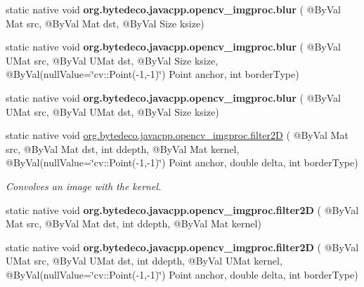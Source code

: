 \begin{DoxyCompactItemize}
\mbox{\label{group__imgproc__filter_ga4830c7c2c9e1f24506bac7bf41da80f0}} 
static native void {\bfseries org.\+bytedeco.\+javacpp.\+opencv\+\_\+imgproc.\+blur} ( @By\+Val Mat src, @By\+Val Mat dst, @By\+Val Size ksize)
\item 
\mbox{\label{group__imgproc__filter_gaf8d9d0c058877480d92f97c45f328347}} 
static native void {\bfseries org.\+bytedeco.\+javacpp.\+opencv\+\_\+imgproc.\+blur} ( @By\+Val U\+Mat src, @By\+Val U\+Mat dst, @By\+Val Size ksize, @By\+Val(null\+Value=\char`\"{}cv\+::\+Point(-\/1,-\/1)\char`\"{}) Point anchor, int border\+Type)
\item 
\mbox{\label{group__imgproc__filter_ga8c4367bdc80978100e7b53b8db658752}} 
static native void {\bfseries org.\+bytedeco.\+javacpp.\+opencv\+\_\+imgproc.\+blur} ( @By\+Val U\+Mat src, @By\+Val U\+Mat dst, @By\+Val Size ksize)
\item 
static native void \hyperlink{group__imgproc__filter_gac272007b4c23c22cf0fd246522a2a34b}{org.\+bytedeco.\+javacpp.\+opencv\+\_\+imgproc.\+filter2D} ( @By\+Val Mat src, @By\+Val Mat dst, int ddepth, @By\+Val Mat kernel, @By\+Val(null\+Value=\char`\"{}cv\+::\+Point(-\/1,-\/1)\char`\"{}) Point anchor, double delta, int border\+Type)
\begin{DoxyCompactList}\small\item\em Convolves an image with the kernel. \end{DoxyCompactList}\item 
\mbox{\label{group__imgproc__filter_ga32707e41b29e2f45a57863769aed9dda}} 
static native void {\bfseries org.\+bytedeco.\+javacpp.\+opencv\+\_\+imgproc.\+filter2D} ( @By\+Val Mat src, @By\+Val Mat dst, int ddepth, @By\+Val Mat kernel)
\item 
\mbox{\label{group__imgproc__filter_gaae4b6c9ace5e9419ee9a3f1f883bda50}} 
static native void {\bfseries org.\+bytedeco.\+javacpp.\+opencv\+\_\+imgproc.\+filter2D} ( @By\+Val U\+Mat src, @By\+Val U\+Mat dst, int ddepth, @By\+Val U\+Mat kernel, @By\+Val(null\+Value=\char`\"{}cv\+::\+Point(-\/1,-\/1)\char`\"{}) Point anchor, double delta, int border\+Type)
\item 
\mbox{\label{group__imgproc__filter_gab00b34dd987b71bf76d7106f14642f4e}} 

\end{DoxyCompactItemize}
